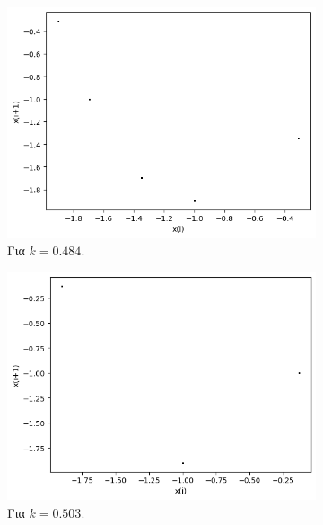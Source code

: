 \begin{figure}[h!]
\begin{subfigure}[b]{0.4\textwidth}
		\includegraphics[width=\textwidth]{LateX images/graphs q19/g5}
		\caption{Για $k=0.484$.}
		\label{f:k94}
	\end{subfigure}
	\hfill
	\begin{subfigure}[b]{0.4\textwidth}
		\centering
		\includegraphics[width=\textwidth]{LateX images/graphs q19/g6}
		\caption{Για $k=0.503$.}
		\label{f:k95}
	\end{subfigure}
	\hfill
	\begin{subfigure}[b]{0.4\textwidth}
		\centering

\end{subfigure}
\end{figure}

